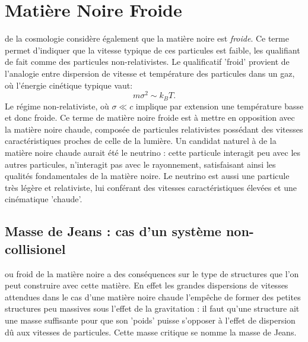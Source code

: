 \section{Matière Noire Froide}

 de la cosmologie considère également que la matière noire est \textit{froide}. Ce terme permet d'indiquer que la vitesse typique de ces particules est faible, les qualifiant de fait comme des particules non-relativistes. Le qualificatif 'froid' provient de l'analogie entre dispersion de vitesse et température des particules dans un gaz, où l'énergie cinétique typique vaut:
\begin{equation}
m\sigma^2 \sim k_B T.
\end{equation}
Le régime non-relativiste, où $\sigma \ll c$ implique par extension une température basse et donc froide. Ce terme de matière noire froide est à mettre en opposition avec la matière noire chaude, composée de particules relativistes possédant des vitesses caractéristiques proches de celle de la lumière. Un candidat naturel à de la matière noire chaude aurait été le neutrino : cette particule interagit peu avec les autres particules, n'interagit pas avec le rayonnement, satisfaisant ainsi les qualités fondamentales de la matière noire. Le neutrino est aussi une particule très légère et relativiste, lui conférant des vitesses caractéristiques élevées et une cinématique 'chaude'.

\subsection{Masse de Jeans : cas d'un système non-collisionel}
 ou froid de la matière noire a des conséquences sur le type de structures que l'on peut construire avec cette matière. En effet les grandes dispersions de vitesses attendues dans le cas d'une matière noire chaude l'empêche de former des petites structures peu massives sous l'effet de la gravitation : il faut qu'une structure ait une masse suffisante pour que son 'poids' puisse s'opposer à l'effet de dispersion dû aux vitesses de particules. Cette masse critique se nomme la masse de Jeans.

